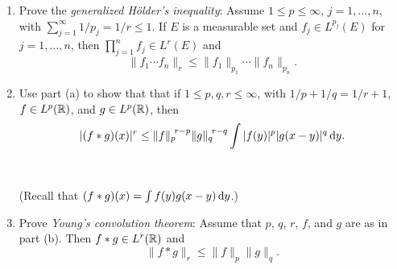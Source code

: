 \begin{problem}
  \hfill
  \begin{enumerate}[label=(\alph*),noitemsep]
  \item Prove the \emph{generalized Hölder's inequality}: Assume
    \(1\leq p\leq\infty\), \(j=1,\dotsc,n\), with
    \(\sum_{j=1}^\infty 1/p_j=1/r\leq 1\). If \(E\) is a measurable set and
    \(f_j\in L^{p_j}(E)\) for \(j=1,\dotsc,n\), then
    \(\prod_{j=1}^n f_j\in L^r(E)\) and
    \[
      \|f_1\dotsm f_n\|_r\leq\|f_1\|_{p_1}\dotsm\|f_n\|_{p_n}.
    \]
  \item Use part (a) to show that that if \(1\leq p,q,r\leq\infty\), with
    \(1/p+1/q=1/r+1\), \(f\in L^p(\mathbb{R})\), and \(g\in L^p(\mathbb{R})\), then
    \[
      |(f*g)(x)|^r\leq{\|f\|_p}^{\!r-p}{\|g\|_q}^{\!r-q}\int|f(y)|^p|g(x-y)|^q\mathop{}\!\mathrm{d}
      y.
    \]
    \\\\
    (Recall that \((f*g)(x)=\int f(y)g(x-y)\mathop{}\!\mathrm{d} y\).)
  \item Prove \emph{Young's convolution theorem}: Assume that \(p\), \(q\),
    \(r\), \(f\), and \(g\) are as in part (b). Then \(f*g\in L^r(\mathbb{R})\)
    and
    \[
      \|f*g\|_r\leq\|f\|_p\|g\|_q.
    \]
  \end{enumerate}
\end{problem}
\begin{solution}
\end{solution}

